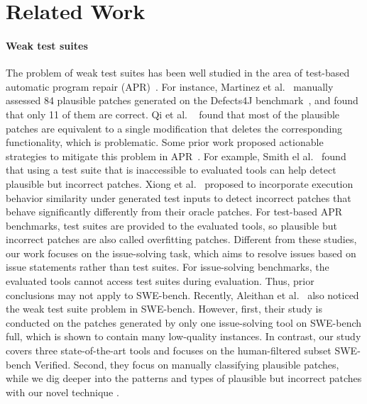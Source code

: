 \section{Related Work}

\paragraph{Weak test suites}
The problem of weak test suites has been well studied in the area of test-based automatic program repair (APR)~\cite{martinez2015automatic, qi2015analysis, smith2015cure, liu2021critical}.
For instance, 
Martinez et al.~\cite{martinez2015automatic} manually assessed 84 plausible patches generated on the Defects4J benchmark~\cite{just2014defects4j}, and found that only 11 of them are correct. 
Qi et al. ~\cite{qi2015analysis} found that most of the plausible patches 
are equivalent to a single modification that deletes the corresponding functionality, which is problematic. 
Some prior work proposed actionable strategies to mitigate this problem in APR~\cite{smith2015cure, xiong2018identifying, yu2019alleviating, yang2023large}. 
For example, 
Smith el al.~\cite{smith2015cure} found that using a test suite that is inaccessible to evaluated tools can help detect plausible but incorrect patches.
Xiong et al.~\cite{xiong2018identifying} proposed to incorporate execution behavior similarity under generated test inputs to detect incorrect patches that behave significantly differently from their oracle patches.
For test-based APR benchmarks, test suites are provided to the evaluated tools, so plausible but incorrect patches are also called overfitting patches.
Different from these studies, our work focuses on the issue-solving task, which aims to resolve issues based on issue statements rather than test suites.
For issue-solving benchmarks, the evaluated tools cannot access test suites during evaluation.
Thus, prior conclusions may not apply to SWE-bench.
Recently, Aleithan et al.~\cite{aleithan2024swe} also noticed the weak test suite problem in SWE-bench.
However, first, their study is conducted on the patches generated by only one issue-solving tool on SWE-bench full, which is shown to contain many low-quality instances.
In contrast, our study covers three state-of-the-art tools and focuses on the human-filtered subset SWE-bench Verified.
Second, they focus on manually classifying plausible patches, while we dig deeper into the patterns and types of plausible but incorrect patches with our novel technique \appname.



